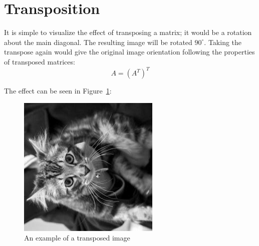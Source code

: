 \section{Transposition}

It is simple to visualize the effect of transposing a matrix; it would be a
rotation about the main diagonal. The resulting image will be rotated
$90^\circ$. Taking the transpose again would give the original image orientation
following the properties of transposed matrices:
\[
A=(A^T)^T
\]

The effect can be seen in Figure~\ref{tr}:

\begin{figure}[h!]
  \centering
  \includegraphics[scale=0.4]{./mat2/transposed.jpg}
  \caption{An example of a transposed image}
  \label{tr}
\end{figure}
